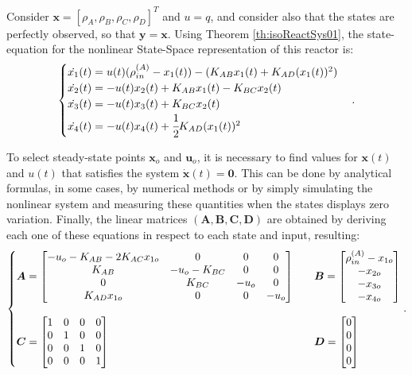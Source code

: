 \documentclass[a4paper,11pt]{book}
\numberwithin{figure}{chapter}
\numberwithin{equation}{chapter}
\numberwithin{table}{chapter}
\theoremstyle{definition}
\begin{document}
Consider $\bm{x} = [\rho_A, \rho_B, \rho_C, \rho_D]^T$ and $u = q$, and consider also that the states are perfectly observed, so that $\bm{y} = \bm{x}$. Using Theorem \ref{th:isoReactSys01},  the state-equation for the nonlinear State-Space representation of this reactor is:
\begin{align}
\begin{cases}
    \dot{x_1}(t) = u(t) (\rho_{in}^{(A)} - x_1(t)) - (K_{AB} x_1(t) + K_{AD} (x_1(t))^2)\\
    \dot{x_2}(t) = -u(t) x_2(t) + K_{AB} x_1(t) - K_{BC} x_2(t) \\
    \dot{x_3}(t) = -u(t) x_3(t) + K_{BC} x_2(t) \\
    \dot{x_4}(t) = -u(t) x_4(t) + \cfrac{1}{2} K_{AD} (x_1(t))^2
\end{cases}
.\end{align}

 To select steady-state points $\bm{x}_o$ and $\bm{u}_o$, it is necessary to find values for $\bm{x}(t)$ and $u(t)$ that satisfies the system $\dot{\bm{x}}(t) = \bm{0}$. This can be done by analytical formulas, in some cases, by numerical methods or by simply simulating the nonlinear system and measuring these quantities when the states displays zero variation. Finally, the linear matrices $(\bm{A}, \bm{B}, \bm{C}, \bm{D})$ are obtained by deriving each one of these equations in respect to each state and input, resulting:
\begin{align}   \label{eq:isoReact01}
\left\{ \begin{matrix*}[l]
    \bm{A} = \begin{bmatrix}
        -u_o - K_{AB} - 2K_{AC} x_{1o} & 0 & 0 & 0 \\ K_{AB} & -u_o - K_{BC} & 0 & 0 \\ 0 & K_{BC} & -u_o & 0 \\ K_{AD} x_{1o} & 0 & 0 & -u_o
    \end{bmatrix} \hfill & &
    \bm{B} = \begin{bmatrix}
        \rho_{in}^{(A)}-x_{1o} \\ -x_{2o} \\ -x_{3o} \\ -x_{4o} 
    \end{bmatrix} \hfill \\  \\ 
    \bm{C} = \begin{bmatrix}
        1 & 0 & 0 & 0 \\ 0 & 1 & 0 & 0 \\ 0 & 0 & 1 & 0 \\ 0 & 0 & 0 & 1
    \end{bmatrix} \hfill & &
    \bm{D} = \begin{bmatrix}
        0 \\ 0 \\ 0 \\ 0
    \end{bmatrix} \hfill
\end{matrix*} \right.
.\end{align}
\end{document}
